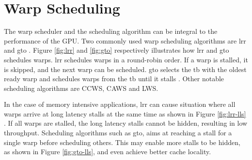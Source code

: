 \section{Warp Scheduling} \label{sec:warp_scheduling}

The warp scheduler and the scheduling algorithm can be integral to the performance of the GPU. Two commonly used warp scheduling algorithms are \acrfull{lrr} and \acrfull{gto} \cite{improving_gpgpu_scheduling}. Figure \ref{fig:lrr} and \ref{fig:gto} respectively illustrates how \acrshort{lrr} and \acrshort{gto} schedules warps. \acrshort{lrr} schedules warps in a round-robin order. If a warp is stalled, it is skipped, and the next warp can be scheduled. \acrshort{gto} selects the \acrshort{tb} with the oldest ready warp and schedules warps from the \acrshort{tb} until it stalls \cite{cache-conscious_wavefront_scheduling}. Other notable scheduling algorithms are CCWS\cite{cache-conscious_wavefront_scheduling}, CAWS\cite{caws} and LWS\cite{improving_gpgpu_scheduling}.

In the case of memory intensive applications, \acrshort{lrr} can cause situation where all warps arrive at long latency stalls at the same time as shown in Figure \ref{fig:lrr-lls} \cite{ZHANG2018520}. If all warps are stalled, the long latency stalls cannot be hidden, resulting in low throughput. Scheduling algorithms such as \acrshort{gto}, aims at reaching a stall for a single warp before scheduling others. This may enable more stalls to be hidden, as shown in Figure \ref{fig:gto-lls}, and even achieve better cache locality\cite{cache-conscious_wavefront_scheduling}\cite{ZHANG2018520}.

